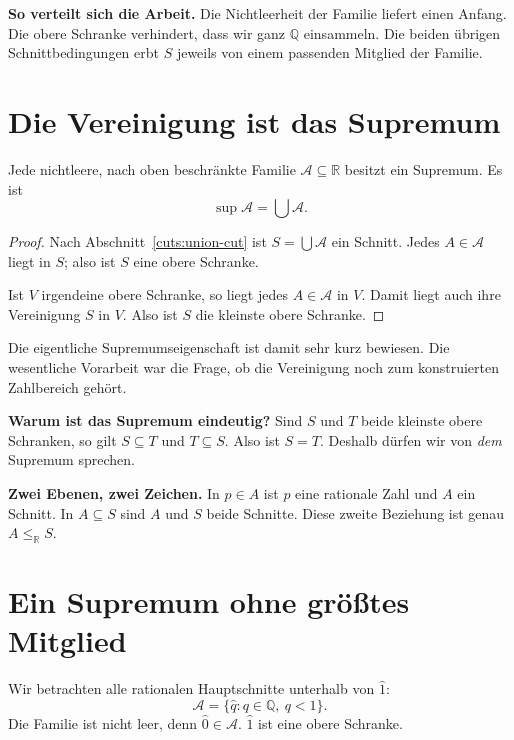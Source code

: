 \textbf{So verteilt sich die Arbeit.}
Die Nichtleerheit der Familie liefert einen Anfang.
Die obere Schranke verhindert, dass wir ganz $\mathbb Q$ einsammeln.
Die beiden übrigen Schnittbedingungen erbt $S$ jeweils von einem
passenden Mitglied der Familie.

\clearpage
\section{Die Vereinigung ist das Supremum}
\label{cuts:complete}

\begin{satz}[Vollständigkeit]
Jede nichtleere, nach oben beschränkte Familie
$\mathcal A\subseteq\mathbb R$ besitzt ein Supremum. Es ist
\[
 \boxed{\sup\mathcal A=\bigcup\mathcal A.}
\]
\end{satz}

\begin{proof}
Nach Abschnitt~\ref{cuts:union-cut} ist $S=\bigcup\mathcal A$ ein Schnitt.
Jedes $A\in\mathcal A$ liegt in $S$; also ist $S$ eine obere Schranke.

Ist $V$ irgendeine obere Schranke, so liegt jedes $A\in\mathcal A$ in $V$.
Damit liegt auch ihre Vereinigung $S$ in $V$.
Also ist $S$ die kleinste obere Schranke.
\end{proof}

Die eigentliche Supremumseigenschaft ist damit sehr kurz bewiesen.
Die wesentliche Vorarbeit war die Frage, ob die Vereinigung noch
zum konstruierten Zahlbereich gehört.

\textbf{Warum ist das Supremum eindeutig?}
Sind $S$ und $T$ beide kleinste obere Schranken, so gilt
$S\subseteq T$ und $T\subseteq S$. Also ist $S=T$.
Deshalb dürfen wir von \emph{dem} Supremum sprechen.

\textbf{Zwei Ebenen, zwei Zeichen.}
In $p\in A$ ist $p$ eine rationale Zahl und $A$ ein Schnitt.
In $A\subseteq S$ sind $A$ und $S$ beide Schnitte.
Diese zweite Beziehung ist genau $A\leq_{\mathbb R}S$.

\clearpage
\section{Ein Supremum ohne größtes Mitglied}
\label{cuts:example}

Wir betrachten alle rationalen Hauptschnitte unterhalb von $\widehat1$:
\[
 \mathcal A=\{\widehat q:q\in\mathbb Q,\ q<1\}.
\]
Die Familie ist nicht leer, denn $\widehat0\in\mathcal A$.
$\widehat1$ ist eine obere Schranke.

